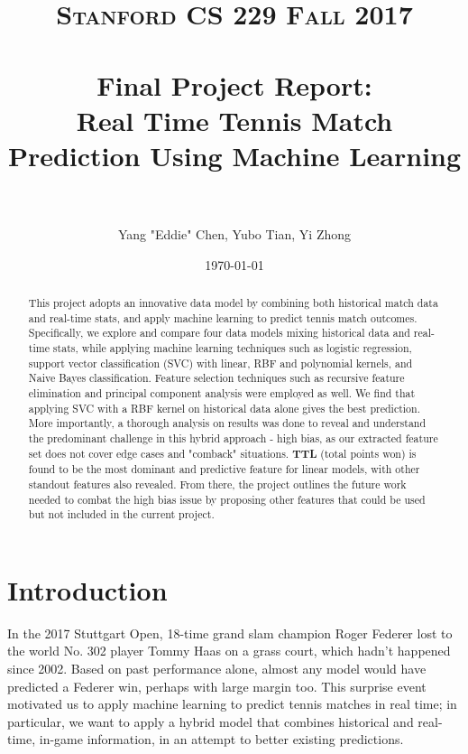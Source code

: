 \documentclass[paper=a4, fontsize=10pt]{scrartcl} %
\title{	
\normalfont \normalsize 
\textsc{Stanford CS 229 Fall 2017} \\ [20pt] %
\horrule{0.5pt} \\[0.4cm] %
\Large Final Project Report: \\
\Large Real Time Tennis Match Prediction Using Machine Learning\\ %
\horrule{2pt} \\[0.5cm] %
}
\author{Yang "Eddie" Chen, Yubo Tian, Yi Zhong} %
\date{\normalsize\today} %
\numberwithin{equation}{section} %
\numberwithin{figure}{section} %
\numberwithin{table}{section} %
\begin{document}
\twocolumn[
\maketitle %
]
\begin{abstract}
This project adopts an innovative data model by combining both historical match data and real-time stats, and apply machine learning to predict tennis match outcomes. Specifically, we explore and compare four data models mixing historical data and real-time stats, while applying machine learning techniques such as logistic regression, support vector classification (SVC) with linear, RBF and polynomial kernels, and Naive Bayes classification. Feature selection techniques such as recursive feature elimination and principal component analysis were employed as well. We find that applying SVC with a RBF kernel on historical data alone gives the best prediction. More importantly, a thorough analysis on results was done to reveal and understand the predominant challenge in this hybrid approach - high bias, as our extracted feature set does not cover edge cases and "comback" situations. \textbf{TTL} (total points won) is found to be the most dominant and predictive feature for linear models, with other standout features also revealed. From there, the project outlines the future work needed to combat the high bias issue by proposing other features that could be used but not included in the current project. 
\end{abstract}

\section{Introduction}
In the 2017 Stuttgart Open, 18-time grand slam champion Roger Federer lost to the world No. 302 player Tommy Haas on a grass court, which hadn't happened since 2002. Based on past performance alone, almost any model would have predicted a Federer win, perhaps with large margin too. This surprise event motivated us to apply machine learning to predict tennis matches in real time; in particular, we want to apply a hybrid model that combines historical and real-time, in-game information, in an attempt to better existing predictions. 
\end{document}
